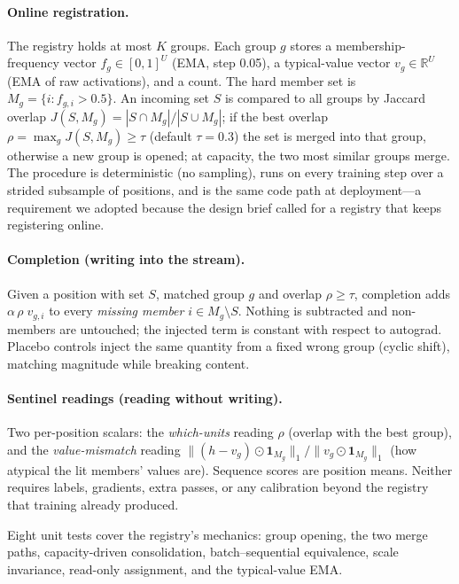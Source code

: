 \documentclass[11pt]{article}
\newcommand{\rrho}{\rho}
\begin{document}
\paragraph{Online registration.} The registry holds at most $K$ groups. Each
group $g$ stores a membership-frequency vector $f_g \in [0,1]^U$ (EMA, step
0.05), a typical-value vector $v_g \in \mathbb{R}^U$ (EMA of raw activations),
and a count. The hard member set is $M_g = \{i : f_{g,i} > 0.5\}$. An incoming
set $S$ is compared to all groups by Jaccard overlap
$J(S, M_g) = |S \cap M_g| / |S \cup M_g|$; if the best overlap
$\rrho = \max_g J(S, M_g) \ge \tau$ (default $\tau{=}0.3$) the set is merged
into that group, otherwise a new group is opened; at capacity, the two most
similar groups merge. The procedure is deterministic (no sampling), runs on
every training step over a strided subsample of positions, and is the same code
path at deployment---a requirement we adopted because the design brief called
for a registry that keeps registering online.

\paragraph{Completion (writing into the stream).} Given a position with set
$S$, matched group $g$ and overlap $\rrho \ge \tau$, completion adds
$\alpha\,\rrho\; v_{g,i}$ to every \emph{missing member} $i \in M_g \setminus
S$. Nothing is subtracted and non-members are untouched; the injected term is
constant with respect to autograd. Placebo controls inject the same quantity
from a fixed wrong group (cyclic shift), matching magnitude while breaking
content.

\paragraph{Sentinel readings (reading without writing).} Two per-position
scalars: the \emph{which-units} reading $\rrho$ (overlap with the best group),
and the \emph{value-mismatch} reading
$\|(h - v_g)\odot \mathbf{1}_{M_g}\|_1 / \|v_g \odot \mathbf{1}_{M_g}\|_1$
(how atypical the lit members' values are). Sequence scores are position
means. Neither requires labels, gradients, extra passes, or any calibration
beyond the registry that training already produced.

Eight unit tests cover the registry's mechanics: group opening, the two merge
paths, capacity-driven consolidation, batch--sequential equivalence, scale
invariance, read-only assignment, and the typical-value EMA.
\end{document}
